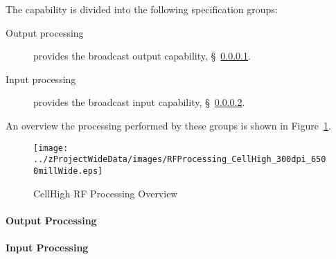 The \ThisSys \ThisSegment \CellHigh capability is divided into the following specification groups:
\begin{description}
	\item[Output processing] provides the \CellHigh broadcast output capability, \S~\ref{loc:RF_CellHigh_Output}.
	\item[Input processing]  provides the \CellHigh broadcast input  capability, \S~\ref{loc:RF_CellHigh_Input}.
\end{description}
An overview the processing performed by these groups is shown in Figure~\ref{fig:CellHigh_RF_Processing}.
\begin{figure}[htbp]
	\centering
		\texttt{[image: ../zProjectWideData/images/RFProcessing\_CellHigh\_300dpi\_6500millWide.eps]}
	\caption[CellHigh RF Processing Overview]{CellHigh RF Processing Overview}
	\label{fig:CellHigh_RF_Processing}
\end{figure}

\KNEADPARAGRAPHNEWPAGE
\paragraph{\CellHigh \RF Output Processing}
\label{loc:RF_CellHigh_Output}
\renewcommand{\ThisSubSegment}{\CellHigh \RF Output Processing\xspace}%


\KNEADPARAGRAPHNEWPAGE
\paragraph{\CellHigh \RF Input Processing}
\label{loc:RF_CellHigh_Input}
\renewcommand{\ThisSubSegment}{\CellHigh \RF Input Processing\xspace}%

